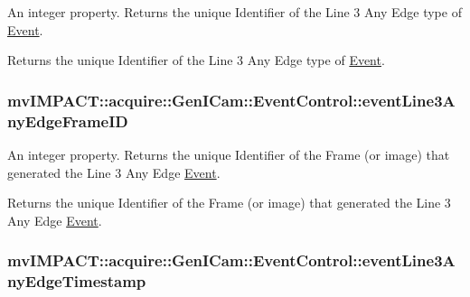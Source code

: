 An integer property. Returns the unique Identifier of the Line 3 Any Edge type of \hyperlink{classmv_i_m_p_a_c_t_1_1acquire_1_1_event}{Event}. 

Returns the unique Identifier of the Line 3 Any Edge type of \hyperlink{classmv_i_m_p_a_c_t_1_1acquire_1_1_event}{Event}. \hypertarget{classmv_i_m_p_a_c_t_1_1acquire_1_1_gen_i_cam_1_1_event_control_a1f74f4c2de3a26db4c39912585a6042b}{
\subsubsection[{event\+Line3\+Any\+Edge\+Frame\+I\+D}]{ mv\+I\+M\+P\+A\+C\+T\+::acquire\+::\+Gen\+I\+Cam\+::\+Event\+Control\+::event\+Line3\+Any\+Edge\+Frame\+I\+D}}\label{classmv_i_m_p_a_c_t_1_1acquire_1_1_gen_i_cam_1_1_event_control_a1f74f4c2de3a26db4c39912585a6042b}


An integer property. Returns the unique Identifier of the Frame (or image) that generated the Line 3 Any Edge \hyperlink{classmv_i_m_p_a_c_t_1_1acquire_1_1_event}{Event}. 

Returns the unique Identifier of the Frame (or image) that generated the Line 3 Any Edge \hyperlink{classmv_i_m_p_a_c_t_1_1acquire_1_1_event}{Event}. \hypertarget{classmv_i_m_p_a_c_t_1_1acquire_1_1_gen_i_cam_1_1_event_control_ac46fadd044d1e513837ce1fe7fa4f498}{
\subsubsection[{event\+Line3\+Any\+Edge\+Timestamp}]{ mv\+I\+M\+P\+A\+C\+T\+::acquire\+::\+Gen\+I\+Cam\+::\+Event\+Control\+::event\+Line3\+Any\+Edge\+Timestamp}}\label{classmv_i_m_p_a_c_t_1_1acquire_1_1_gen_i_cam_1_1_event_control_ac46fadd044d1e513837ce1fe7fa4f498}


